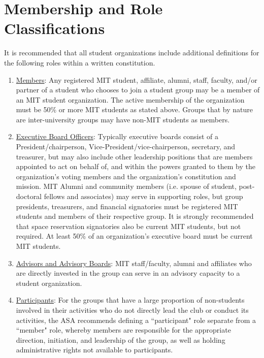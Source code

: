 \documentclass[12pt]{article}
\def\ul{\underline}
\begin{document}
\section{Membership and Role Classifications}
\label{groups_membership}
It is recommended that all student organizations include additional definitions for the following roles
    within a written constitution.
\begin{enumerate}
    \item \ul{Members}: Any registered MIT student, affiliate, alumni, staff, faculty, and/or partner of a
        student who chooses to join a student group may be a member of an MIT student organization.
    The active membership of the organization must be 50\% or more MIT students as stated above.
    Groups that by nature are inter-university groups may have non-MIT students as members.

    \item \ul{Executive Board Officers}: Typically executive boards consist of a President/chairperson,
        Vice-President/vice-chairperson, secretary, and treasurer, but may also include other leadership
        positions that are members appointed to act on behalf of, and within the powers granted to them
        by the organization's voting members and the organization's constitution and mission.
    MIT Alumni and community members (i.e. spouse of student, post-doctoral fellows and associates) may serve
        in supporting roles, but group presidents, treasurers, and financial signatories must be registered MIT
        students and members of their respective group.
    It is strongly recommended that space reservation signatories also be current MIT students, but not required.
    At least 50\% of an organization's executive board must be current MIT students.

    \item \ul{Advisors and Advisory Boards}: MIT staff/faculty, alumni and affiliates who are directly invested in
        the group can serve in an advisory capacity to a student organization.

    \item \ul{Participants}: For the groups that have a large proportion of non-students involved in their
        activities who do not directly lead the club or conduct its activities, the ASA recommends defining a
        ``participant" role separate from a ``member" role, whereby members are responsible for the appropriate
        direction, initiation, and leadership of the group, as well as holding administrative rights not available
        to participants.
\end{enumerate}
\end{document}
